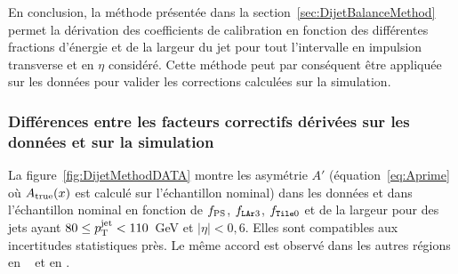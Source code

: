 En conclusion, la m\'ethode pr\'esent\'ee dans la section~\ref{sec:DijetBalanceMethod} permet la d\'erivation des coefficients de calibration en fonction des diff\'erentes fractions d'\'energie et de la largeur du jet pour tout l'intervalle en impulsion transverse et en $\eta$ consid\'er\'e. Cette m\'ethode peut par cons\'equent \^etre appliqu\'ee sur les donn\'ees pour valider les corrections calcul\'ees sur la simulation.

\subsubsection{Diff\'erences entre les facteurs correctifs d\'eriv\'ees sur les donn\'ees et sur la simulation}
\label{sec:MCBased_vs_DataBased}

La figure~\ref{fig:DijetMethodDATA} montre les asym\'etrie $A'$ (\'equation~\ref{eq:Aprime} o\`u $A_{\rm true}(x)$ est calcul\'e sur l'\'echantillon \pythia{} nominal) dans les donn\'ees et dans l'\'echantillon \pythia{} nominal en fonction de  $f_{\rm PS}$, $f_{\texttt{LAr} 3}$, $f_{\texttt{Tile} 0}$ et de la largeur pour des jets ayant  $80 \le p_{\mathrm{T}}^\mathrm{jet} < 110$~GeV et $|\eta| < 0,6$. Elles sont compatibles aux incertitudes statistiques pr\`es. Le m\^eme accord est observ\'e dans les autres r\'egions en \eta~ et en \ptjet.

